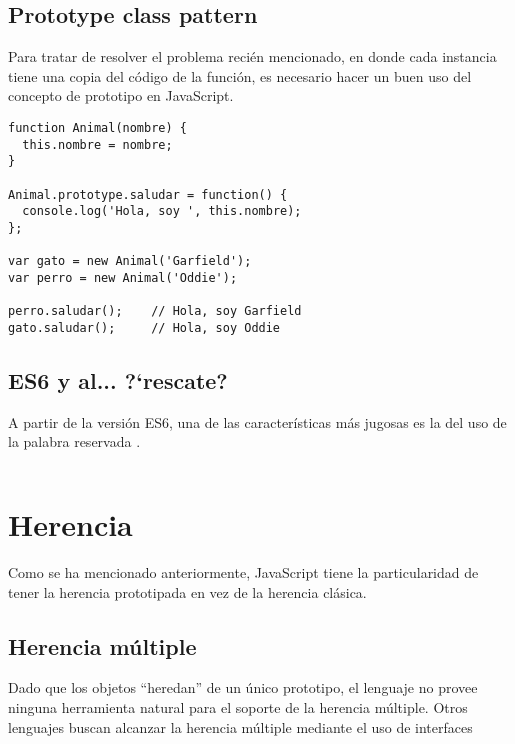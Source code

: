 \subsection{Prototype class pattern}

Para tratar de resolver el problema recién mencionado, en donde cada instancia tiene una copia del código de la función, es necesario hacer un buen uso del concepto de prototipo en JavaScript.

\begin{lstlisting}[title={Prototype class pattern}]
function Animal(nombre) {
  this.nombre = nombre;
}

Animal.prototype.saludar = function() {
  console.log('Hola, soy ', this.nombre);
};

var gato = new Animal('Garfield');
var perro = new Animal('Oddie');

perro.saludar(); 	// Hola, soy Garfield
gato.saludar(); 	// Hola, soy Oddie
\end{lstlisting}


\subsection{ES6 y  al... ?`rescate?}

A partir de la versión ES6, una de las características más jugosas es la del uso de la palabra reservada .

\begin{lstlisting}[title={Ejemplo de \code{class}}]

\end{lstlisting}



\section{Herencia}

Como se ha mencionado anteriormente, JavaScript tiene la particularidad de tener la herencia prototipada en vez de la herencia clásica.

\subsection{Herencia múltiple}

Dado que los objetos "`heredan"' de un único prototipo, el lenguaje no provee ninguna herramienta natural para el soporte de la herencia múltiple. Otros lenguajes buscan alcanzar la herencia múltiple mediante el uso de interfaces

